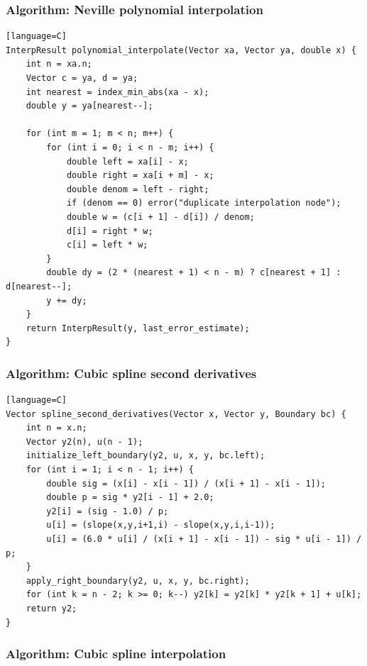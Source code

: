 \documentclass[11pt]{article}
\begin{document}
\subsubsection{Algorithm: Neville polynomial interpolation}\label{algorithm-neville-polynomial-interpolation}

\begin{verbatim}[language=C]
InterpResult polynomial_interpolate(Vector xa, Vector ya, double x) {
    int n = xa.n;
    Vector c = ya, d = ya;
    int nearest = index_min_abs(xa - x);
    double y = ya[nearest--];

    for (int m = 1; m < n; m++) {
        for (int i = 0; i < n - m; i++) {
            double left = xa[i] - x;
            double right = xa[i + m] - x;
            double denom = left - right;
            if (denom == 0) error("duplicate interpolation node");
            double w = (c[i + 1] - d[i]) / denom;
            d[i] = right * w;
            c[i] = left * w;
        }
        double dy = (2 * (nearest + 1) < n - m) ? c[nearest + 1] : d[nearest--];
        y += dy;
    }
    return InterpResult(y, last_error_estimate);
}
\end{verbatim}

\subsubsection{Algorithm: Cubic spline second derivatives}\label{algorithm-cubic-spline-second-derivatives}

\begin{verbatim}[language=C]
Vector spline_second_derivatives(Vector x, Vector y, Boundary bc) {
    int n = x.n;
    Vector y2(n), u(n - 1);
    initialize_left_boundary(y2, u, x, y, bc.left);
    for (int i = 1; i < n - 1; i++) {
        double sig = (x[i] - x[i - 1]) / (x[i + 1] - x[i - 1]);
        double p = sig * y2[i - 1] + 2.0;
        y2[i] = (sig - 1.0) / p;
        u[i] = (slope(x,y,i+1,i) - slope(x,y,i,i-1));
        u[i] = (6.0 * u[i] / (x[i + 1] - x[i - 1]) - sig * u[i - 1]) / p;
    }
    apply_right_boundary(y2, u, x, y, bc.right);
    for (int k = n - 2; k >= 0; k--) y2[k] = y2[k] * y2[k + 1] + u[k];
    return y2;
}
\end{verbatim}

\subsubsection{Algorithm: Cubic spline interpolation}\label{algorithm-cubic-spline-interpolation}
\end{document}

